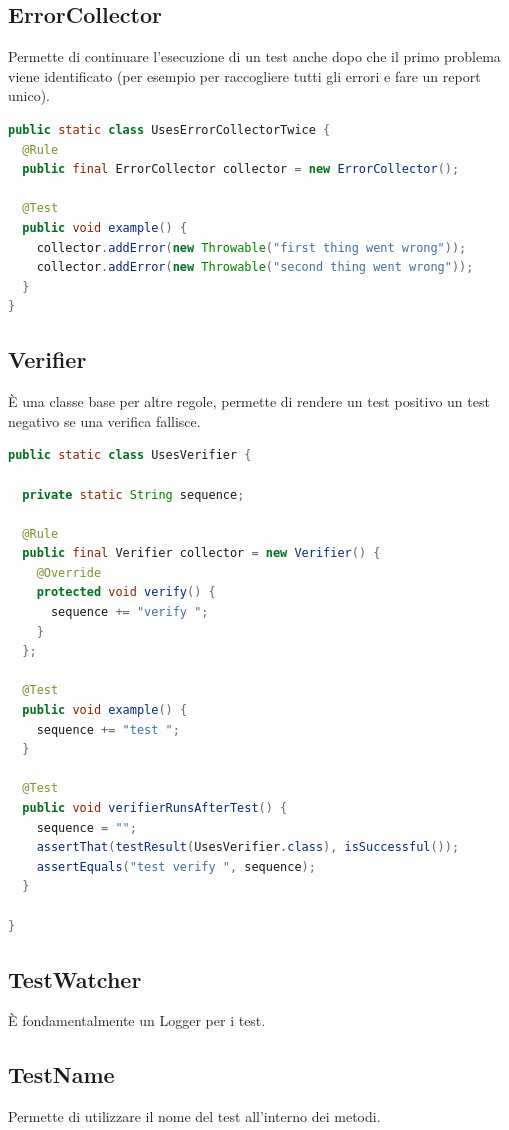 \documentclass[11pt,a4paper]{book}
\begin{document}
\subsection{ErrorCollector}
Permette di continuare l'esecuzione di un test anche dopo che il primo problema viene identificato (per esempio per raccogliere tutti gli errori e fare un report unico).

\begin{lstlisting}[language = Java]
public static class UsesErrorCollectorTwice {
  @Rule
  public final ErrorCollector collector = new ErrorCollector();
  
  @Test
  public void example() {
    collector.addError(new Throwable("first thing went wrong"));
    collector.addError(new Throwable("second thing went wrong"));
  }
}
\end{lstlisting}

\subsection{Verifier}
È una classe base per altre regole, permette di rendere un test positivo un test negativo se una verifica fallisce.
\begin{lstlisting}[language = Java]
public static class UsesVerifier {
  
  private static String sequence;
  
  @Rule
  public final Verifier collector = new Verifier() {
    @Override
    protected void verify() {
      sequence += "verify ";
    }
  };

  @Test
  public void example() {
    sequence += "test ";
  }
  
  @Test
  public void verifierRunsAfterTest() {
    sequence = "";
    assertThat(testResult(UsesVerifier.class), isSuccessful());
    assertEquals("test verify ", sequence);
  }

}
\end{lstlisting}

\subsection{TestWatcher}
È fondamentalmente un Logger per i test.

\subsection{TestName}
Permette di utilizzare il nome del test all'interno dei metodi.
\end{document}
